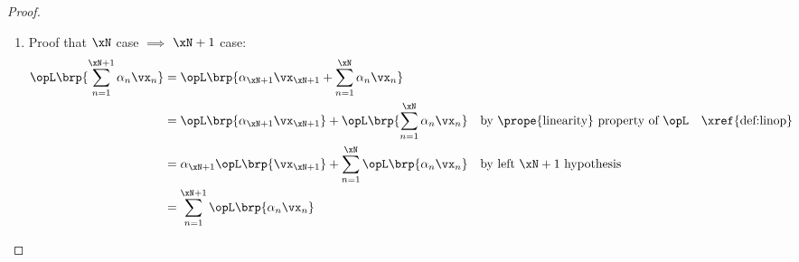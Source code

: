 \begin{proof}
\begin{enumerate}
\begin{enumerate}
      \item Proof that $\xN$ case $\implies$ $\xN+1$ case:
        \begin{align*}
          \opL\brp{\sum_{n=1}^{\xN+1} \alpha_n\vx_n}
            &= \opL\brp{\alpha_{\xN+1}\vx_{\xN+1} + \sum_{n=1}^{\xN} \alpha_n\vx_n}
          \\&= \opL\brp{\alpha_{\xN+1}\vx_{\xN+1}} + \opL\brp{\sum_{n=1}^{\xN} \alpha_n\vx_n}
            && \text{by \prope{linearity} property of $\opL$}
            && \text{\xref{def:linop}}
          \\&= \alpha_{\xN+1}\opL\brp{\vx_{\xN+1}} + \sum_{n=1}^{\xN} \opL\brp{\alpha_n\vx_n}
            && \text{by left $\xN+1$ hypothesis}
          \\&= \sum_{n=1}^{\xN+1} \opL\brp{\alpha_n\vx_n}
        \end{align*}
    \end{enumerate}
\end{enumerate}
\end{proof}

